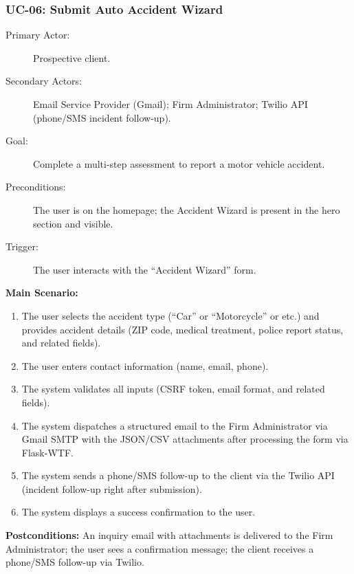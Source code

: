 \documentclass{article}
\begin{document}
\subsubsection{UC-06: Submit Auto Accident Wizard}\label{uc:06}
\begin{description}
  \item[Primary Actor:] Prospective client.
  \item[Secondary Actors:] Email Service Provider (Gmail); Firm Administrator; Twilio API (phone/SMS incident follow-up).
  \item[Goal:] Complete a multi-step assessment to report a motor vehicle accident.
  \item[Preconditions:] The user is on the homepage; the Accident Wizard is present in the hero section and visible.
  \item[Trigger:] The user interacts with the ``Accident Wizard'' form.
\end{description}
\textbf{Main Scenario:}
\begin{enumerate}
  \item The user selects the accident type (``Car'' or ``Motorcycle'' or etc.) and provides accident details (ZIP code, medical treatment, police report status, and related fields).
  \item The user enters contact information (name, email, phone).
  \item The system validates all inputs (CSRF token, email format, and related fields).
  \item The system dispatches a structured email to the Firm Administrator via Gmail SMTP with the JSON/CSV attachments after processing the form via Flask-WTF.
  \item The system sends a phone/SMS follow-up to the client via the Twilio API (incident follow-up right after submission).
  \item The system displays a success confirmation to the user.
\end{enumerate}
\textbf{Postconditions:} An inquiry email with attachments is delivered to the Firm Administrator; the user sees a confirmation message; the client receives a phone/SMS follow-up via Twilio.
\end{document}
